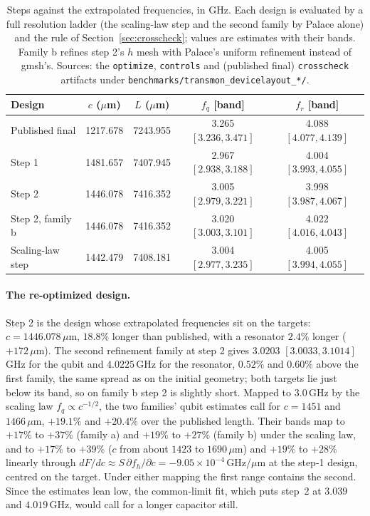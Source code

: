 \documentclass{anvil-paper}
\begin{document}
\begin{table}[htbp]
  \centering
  \caption{Steps against the extrapolated frequencies, in GHz. Each design
  is evaluated by a full resolution ladder (the scaling-law step and the
  second family by Palace alone) and the rule of
  Section~\ref{sec:crosscheck}; values are estimates with their bands.
  Family b refines step 2's $h$ mesh with Palace's uniform refinement
  instead of gmsh's. Sources: the \texttt{optimize}, \texttt{controls} and
  (published final) \texttt{crosscheck} artifacts under
  \texttt{benchmarks/transmon\_devicelayout\_*/}.}
  \label{tab:newton-conv}
  \footnotesize
  \begin{tabular}{@{}lcccc@{}}
    \toprule
    Design & $c$ ($\mu$m) & $L$ ($\mu$m) & $f_q$ [band] & $f_r$ [band] \\
    \midrule
    Published final & 1217.678 & 7243.955 & 3.265 $[3.236, 3.471]$ & 4.088 $[4.077, 4.139]$ \\
    Step 1 & 1481.657 & 7407.945 & 2.967 $[2.938, 3.188]$ & 4.004 $[3.993, 4.055]$ \\
    Step 2 & 1446.078 & 7416.352 & 3.005 $[2.979, 3.221]$ & 3.998 $[3.987, 4.067]$ \\
    Step 2, family b & 1446.078 & 7416.352 & 3.020 $[3.003, 3.101]$ & 4.022 $[4.016, 4.043]$ \\
    Scaling-law step & 1442.479 & 7408.181 & 3.004 $[2.977, 3.235]$ & 4.005 $[3.994, 4.055]$ \\
    \bottomrule
  \end{tabular}
\end{table}

\paragraph{The re-optimized design.}
Step 2 is the design whose extrapolated frequencies sit on the targets:
$c = 1446.078\,\mu$m, $18.8\%$ longer than published, with a resonator
$2.4\%$ longer ($+172\,\mu$m). The second refinement family at step 2 gives
$3.0203$ $[3.0033, 3.1014]$\,GHz for the qubit and $4.0225$\,GHz for the
resonator, $0.52\%$ and $0.60\%$ above the first family, the same spread as
on the initial geometry; both targets lie just below its band, so on family
b step 2 is slightly short. Mapped to $3.0$\,GHz by the scaling law $f_q
\propto c^{-1/2}$, the two families' qubit estimates call for $c = 1451$ and
$1466\,\mu$m, $+19.1\%$ and $+20.4\%$ over the published length. Their
bands map to $+17\%$ to $+37\%$ (family a) and $+19\%$ to $+27\%$
(family b) under the scaling law, and to $+17\%$ to $+39\%$ ($c$ from about
$1423$ to $1690\,\mu$m) and $+19\%$ to $+28\%$ linearly through $dF/dc
\approx S\,\partial f_h/\partial c = -9.05\times10^{-4}$\,GHz/$\mu$m at
the step-1 design, centred on the target. Under either mapping the first
range contains the second. Since the estimates lean low, the common-limit
fit, which puts step~2 at $3.039$ and $4.019$\,GHz, would call for a longer
capacitor still.
\end{document}

